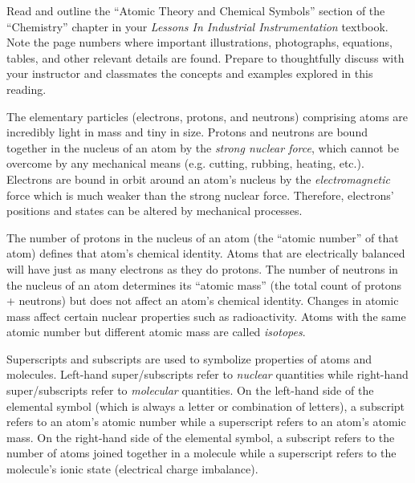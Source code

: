 
Read and outline the ``Atomic Theory and Chemical Symbols'' section of the ``Chemistry'' chapter in your {\it Lessons In Industrial Instrumentation} textbook.  Note the page numbers where important illustrations, photographs, equations, tables, and other relevant details are found.  Prepare to thoughtfully discuss with your instructor and classmates the concepts and examples explored in this reading.














The elementary particles (electrons, protons, and neutrons) comprising atoms are incredibly light in mass and tiny in size.  Protons and neutrons are bound together in the nucleus of an atom by the {\it strong nuclear force}, which cannot be overcome by any mechanical means (e.g. cutting, rubbing, heating, etc.).  Electrons are bound in orbit around an atom's nucleus by the {\it electromagnetic} force which is much weaker than the strong nuclear force.  Therefore, electrons' positions and states can be altered by mechanical processes.

\vskip 10pt

The number of protons in the nucleus of an atom (the ``atomic number'' of that atom) defines that atom's chemical identity.  Atoms that are electrically balanced will have just as many electrons as they do protons.  The number of neutrons in the nucleus of an atom determines its ``atomic mass'' (the total count of protons + neutrons) but does not affect an atom's chemical identity.  Changes in atomic mass affect certain nuclear properties such as radioactivity.  Atoms with the same atomic number but different atomic mass are called {\it isotopes}. 

\vskip 10pt

Superscripts and subscripts are used to symbolize properties of atoms and molecules.  Left-hand super/subscripts refer to {\it nuclear} quantities while right-hand super/subscripts refer to {\it molecular} quantities.  On the left-hand side of the elemental symbol (which is always a letter or combination of letters), a subscript refers to an atom's atomic number while a superscript refers to an atom's atomic mass.  On the right-hand side of the elemental symbol, a subscript refers to the number of atoms joined together in a molecule while a superscript refers to the molecule's ionic state (electrical charge imbalance).

